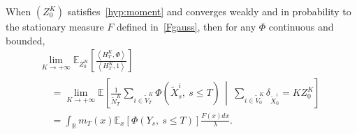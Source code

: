 \documentclass[AHL,Unicode,longabstracts,published]{cedram}
\newcommand*\R{\mathbb{R}}
\newcommand*\E{\mathbb{E}}
\begin{document}
\begin{prop}\label{prop:hist}
When $(Z^K_0)$ satisfies~\eqref{hyp:moment} and converges weakly and in probability to the stationary measure $F$ defined in~\eqref{Fgauss}, then for any $\Phi$ continuous and bounded,
\begin{multline}\label{eq:hist}
\lim_{K \rightarrow +\infty} \E_{Z^K_0}\left[\frac{\left\langle H^K_T,\Phi\right\rangle}{\left\langle H^K_T,1\right\rangle}\right]\\
\begin{aligned}
&=\lim_{K \to +\infty} \E\left[\frac{1}{\widetilde{N}^K_{T}}\sum_{i \in \widetilde{V}^K_{T}}\Phi\left(\widetilde X^i_{s},\ s\leq T\right) \, \middle|\ \sum_{i \in \widetilde V^K_{0}} \delta_{\widetilde{X}^i_{0}}= K Z^K_0\right]\\
&= \int_{\R} m_{T}(x) \E_{x}\left[\Phi\left(Y_{s},\ s\leq T\right)\right] \frac{F(x)dx}{\lambda}.
\end{aligned}
\end{multline}
\end{prop}
\end{document}
